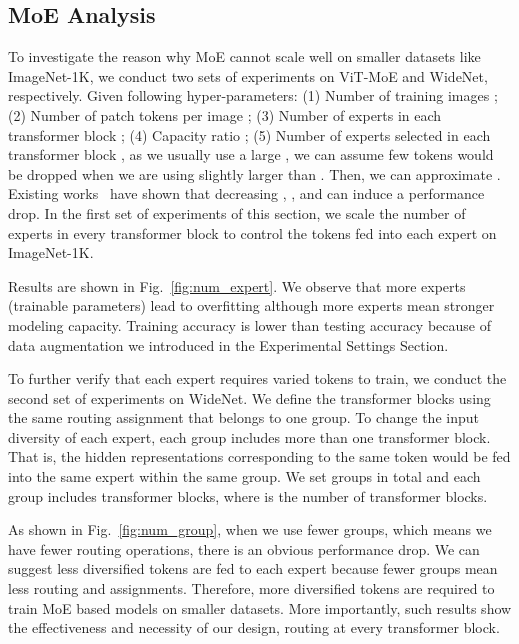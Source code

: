 \documentclass[letterpaper]{article} \usepackage{aaai22}  \usepackage{times}  \usepackage{helvet}  \usepackage{courier}  \usepackage[hyphens]{url}  \usepackage{graphicx} \urlstyle{rm} \def\UrlFont{\rm}  \usepackage{natbib}  \usepackage{caption} \DeclareCaptionStyle{ruled}{labelfont=normalfont,labelsep=colon,strut=off} \frenchspacing  \setlength{\pdfpagewidth}{8.5in}  \setlength{\pdfpageheight}{11in}  \usepackage{algorithm}
\begin{document}
\subsection{MoE Analysis} 


To investigate the reason why MoE cannot scale well on smaller datasets like ImageNet-1K, we conduct two sets of experiments on ViT-MoE and WideNet, respectively. Given following hyper-parameters: (1) Number of training images ; (2) Number of patch tokens per image ; (3) Number of experts in each transformer block ; (4) Capacity ratio ; (5) Number of experts selected in each transformer block , as we usually use a large , we can assume few tokens would be dropped when we are using  slightly larger than . Then, we can approximate . Existing works~\citep{riquelme2021scaling,yang2021exploring} have shown that decreasing , ,  and  can induce a performance drop. In the first set of experiments of this section, we scale the number of experts in every transformer block  to control the tokens fed into each expert on ImageNet-1K.















Results are shown in Fig.~\ref{fig:num_expert}. We observe that more experts (trainable parameters) lead to overfitting although more experts mean stronger modeling capacity. Training accuracy is lower than testing accuracy because of data augmentation we introduced in the Experimental Settings Section.





To further verify that each expert requires varied tokens to train, we conduct the second set of experiments on WideNet. We define the transformer blocks using the same routing assignment that belongs to one group. To change the input diversity of each expert, each group includes more than one transformer block. That is, the hidden representations corresponding to the same token would be fed into the same expert within the same group. We set  groups in total and each group includes  transformer blocks, where  is the number of transformer blocks.  

As shown in Fig.~\ref{fig:num_group}, when we use fewer groups, which means we have fewer routing operations, there is an obvious performance drop. We can suggest less diversified tokens are fed to each expert because fewer groups mean less routing and assignments. Therefore, more diversified tokens are required to train MoE based models on smaller datasets. More importantly, such results show the effectiveness and necessity of our design, routing at every transformer block.
\end{document}
